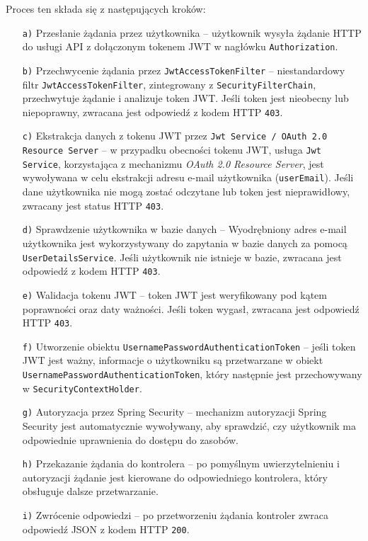 Proces ten składa się z następujących kroków:
\begin{enumerate}
    \item[\texttt{a)}] Przesłanie żądania przez użytkownika -- użytkownik wysyła żądanie HTTP do usługi API z dołączonym tokenem JWT w nagłówku \texttt{Authorization}.
    
    \item[\texttt{b)}] Przechwycenie żądania przez \texttt{JwtAccessTokenFilter} -- niestandardowy filtr \texttt{JwtAccessTokenFilter}, zintegrowany z \texttt{SecurityFilterChain}, przechwytuje żądanie i analizuje token JWT. Jeśli token jest nieobecny lub niepoprawny, zwracana jest odpowiedź z kodem HTTP \texttt{403}.
    
    \item[\texttt{c)}] Ekstrakcja danych z tokenu JWT przez \texttt{Jwt Service / OAuth 2.0 Resource Server} -- w przypadku obecności tokenu JWT, usługa \texttt{Jwt Service}, korzystająca z mechanizmu \emph{OAuth 2.0 Resource Server}, jest wywoływana w celu ekstrakcji adresu e-mail użytkownika (\texttt{userEmail}). Jeśli dane użytkownika nie mogą zostać odczytane lub token jest nieprawidłowy, zwracany jest status HTTP \texttt{403}.

    \item[\texttt{d)}] Sprawdzenie użytkownika w bazie danych -- Wyodrębniony adres e-mail użytkownika jest wykorzystywany do zapytania w bazie danych za pomocą \texttt{UserDetailsService}. Jeśli użytkownik nie istnieje w bazie, zwracana jest odpowiedź z kodem HTTP \texttt{403}.
    
    \item[\texttt{e)}] Walidacja tokenu JWT -- token JWT jest weryfikowany pod kątem poprawności oraz daty ważności. Jeśli token wygasł, zwracana jest odpowiedź HTTP \texttt{403}.
    
    \item[\texttt{f)}] Utworzenie obiektu \texttt{UsernamePasswordAuthenticationToken} -- jeśli token JWT jest ważny, informacje o użytkowniku są przetwarzane w obiekt \texttt{UsernamePasswordAuthenticationToken}, który następnie jest przechowywany w \texttt{SecurityContextHolder}.
    
    \item[\texttt{g)}] Autoryzacja przez Spring Security -- mechanizm autoryzacji Spring Security jest automatycznie wywoływany, aby sprawdzić, czy użytkownik ma odpowiednie uprawnienia do dostępu do zasobów.
    
    \item[\texttt{h)}] Przekazanie żądania do kontrolera -- po pomyślnym uwierzytelnieniu i autoryzacji żądanie jest kierowane do odpowiedniego kontrolera, który obsługuje dalsze przetwarzanie.
    
    \item[\texttt{i)}] Zwrócenie odpowiedzi -- po przetworzeniu żądania kontroler zwraca odpowiedź JSON z kodem HTTP \texttt{200}.
\end{enumerate}

